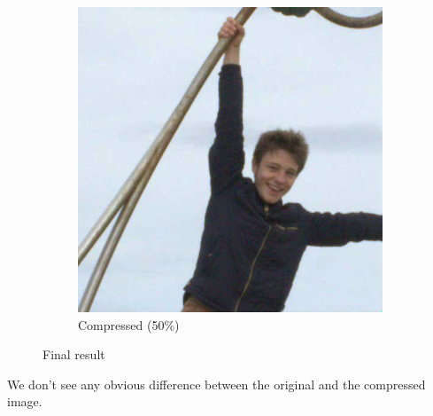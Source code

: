 \begin{figure}[H]
\begin{subfigure}[t]{0.4\textwidth}
        \includegraphics[width=\linewidth]{src/assets/tests/reconstructed.png}
        \caption{Compressed (50\%)}
        \label{fig:tests-com}
    \end{subfigure}


    \caption{Final result}
    \label{fig:final}
\end{figure}


We don't see any obvious difference between the original and the compressed image.